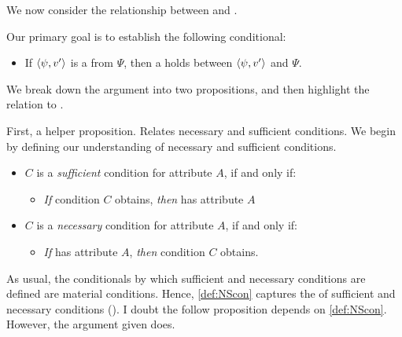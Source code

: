 \begin{note}
  We now consider the relationship between  and .

  Our primary goal is to establish the following conditional:

  \begin{itemize}
  \item
    If \(\langle \psi, v' \rangle\) is a \fc{} from \(\Psi\), then a \ros{} holds between \(\langle \psi, v' \rangle\) and \(\Psi\).
  \end{itemize}

  \noindent%
  We break down the argument into two propositions, and then highlight the relation to \issueConstraint{}.
\end{note}

\begin{note}
  First, a helper proposition.
  Relates necessary and sufficient conditions.
  We begin by defining our understanding of necessary and sufficient conditions.

  \begin{definition}
    \label{def:NScon}
    \vspace{-\baselineskip}
    \begin{itemize}
    \item
      \(C\) is a \emph{sufficient} condition for attribute \(A\), if and only if:
      \begin{itemize}
      \item
        \emph{If} condition \(C\) obtains, \emph{then} \vAgent{} has attribute \(A\)
      \end{itemize}
    \item
      \(C\) is a \emph{necessary} condition for attribute \(A\), if and only if:
      \begin{itemize}
      \item
        \emph{If} \vAgent{} has attribute \(A\), \emph{then} condition \(C\) obtains.
      \end{itemize}
    \end{itemize}
    \vspace{-\baselineskip}
  \end{definition}

  \noindent%
  As usual, the conditionals by which sufficient and necessary conditions are defined are material conditions.
  Hence, \autoref{def:NScon} captures the  of sufficient and necessary conditions
  (\cite[cf.][\S2]{Brennan:2022aa}).
  I doubt the follow proposition depends on \autoref{def:NScon}.
  However, the argument given does.


\end{note}
